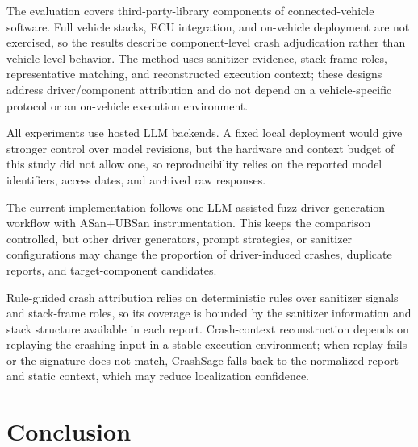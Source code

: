 \documentclass[pdflatex,sn-basic]{sn-jnl}%
\theoremstyle{thmstyleone}%
\theoremstyle{thmstyletwo}%
\theoremstyle{thmstylethree}%
\begin{document}
{\color{blue}
The evaluation covers third-party-library components of connected-vehicle software. Full vehicle stacks, ECU integration, and on-vehicle deployment are not exercised, so the results describe component-level crash adjudication rather than vehicle-level behavior. The method uses sanitizer evidence, stack-frame roles, representative matching, and reconstructed execution context; these designs address driver/component attribution and do not depend on a vehicle-specific protocol or an on-vehicle execution environment.
}

{\color{blue}
All experiments use hosted LLM backends. A fixed local deployment would give stronger control over model revisions, but the hardware and context budget of this study did not allow one, so reproducibility relies on the reported model identifiers, access dates, and archived raw responses.
}

The current implementation follows one LLM-assisted fuzz-driver generation workflow with ASan+UBSan instrumentation. This keeps the comparison controlled, but other driver generators, prompt strategies, or sanitizer configurations may change the proportion of driver-induced crashes, duplicate reports, and target-component candidates.

Rule-guided crash attribution relies on deterministic rules over sanitizer signals and stack-frame roles, so its coverage is bounded by the sanitizer information and stack structure available in each report. Crash-context reconstruction depends on replaying the crashing input in a stable execution environment; when replay fails or the signature does not match, CrashSage falls back to the normalized report and static context, which may reduce localization confidence.

\FloatBarrier

\section{Conclusion}
\label{sec:conclusion}
\end{document}
